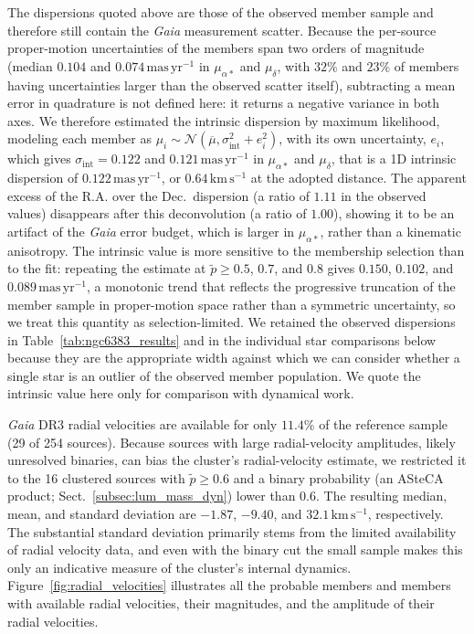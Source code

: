 \documentclass{aa}
\begin{document}
The dispersions quoted above are those of the observed member sample and therefore still contain the \textit{Gaia} measurement scatter. Because the per-source proper-motion uncertainties of the members span two orders of magnitude (median $0.104$ and $0.074\,\mathrm{mas\,yr^{-1}}$ in $\mu_{\alpha*}$ and $\mu_\delta$, with $32\%$ and $23\%$ of members having uncertainties larger than the observed scatter itself), subtracting a mean error in quadrature is not defined here: it returns a negative variance in both axes. We therefore estimated the intrinsic dispersion by maximum likelihood, modeling each member as $\mu_i \sim \mathcal{N}(\overline{\mu}, \sigma_{\mathrm{int}}^2 + e_i^2)$, with its own uncertainty, $e_i$, which gives $\sigma_{\mathrm{int}} = 0.122$ and $0.121\,\mathrm{mas\,yr^{-1}}$ in $\mu_{\alpha*}$ and $\mu_\delta$, that is a 1D intrinsic dispersion of $0.122\,\mathrm{mas\,yr^{-1}}$, or $0.64\,\mathrm{km\,s^{-1}}$ at the adopted distance. The apparent excess of the R.A. over the Dec.\ dispersion (a ratio of $1.11$ in the observed values) disappears after this deconvolution (a ratio of $1.00$), showing it to be an artifact of the \textit{Gaia} error budget, which is larger in $\mu_{\alpha*}$, rather than a kinematic anisotropy. The intrinsic value is more sensitive to the membership selection than to the fit: repeating the estimate at $\tilde{p}\geq0.5$, $0.7$, and $0.8$ gives $0.150$, $0.102$, and $0.089\,\mathrm{mas\,yr^{-1}}$, a monotonic trend that reflects the progressive truncation of the member sample in proper-motion space rather than a symmetric uncertainty, so we treat this quantity as selection-limited. We retained the observed dispersions in Table~\ref{tab:ngc6383_results} and in the individual star comparisons below because they are the appropriate width against which we can consider whether a single star is an outlier of the observed member population. We quote the intrinsic value here only for comparison with dynamical work.

\textit{Gaia} DR3 radial velocities are available for only $11.4$\% of the reference sample (29 of 254 sources). Because sources with large radial-velocity amplitudes, likely unresolved binaries, can bias the cluster's radial-velocity estimate, we restricted it to the 16 clustered sources with $\tilde{p}\geq0.6$ and a binary probability (an ASteCA product; Sect.~\ref{subsec:lum_mass_dyn}) lower than $0.6$. The resulting median, mean, and standard deviation are $-1.87$, $-9.40$, and $32.1\,\mathrm{km\,s^{-1}}$, respectively. The substantial standard deviation primarily stems from the limited availability of radial velocity data, and even with the binary cut the small sample makes this only an indicative measure of the cluster's internal dynamics. Figure~\ref{fig:radial_velocities} illustrates all the probable members and members with available radial velocities, their magnitudes, and the amplitude of their radial velocities.
\end{document}
